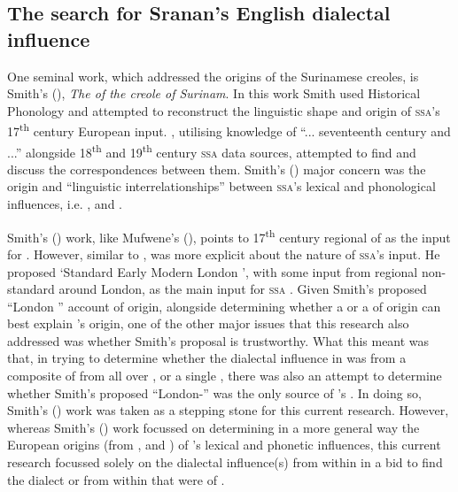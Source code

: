 \subsection{The search for Sranan's English dialectal influence}
One seminal work, which addressed the  origins of the Surinamese  creoles, is Smith's (\citeyear{Smith87}), \textit{The  of the creole  of Surinam}. In this work Smith used Historical Phonology and attempted to reconstruct the linguistic shape and origin of \textsc{ssa}'s 17\textsuperscript{th} century European input.  \citet[6]{Smith87}, utilising knowledge of  ``... seventeenth century  and ...'' alongside 18\textsuperscript{th} and 19\textsuperscript{th} century \textsc{ssa} data sources, attempted to find and discuss the correspondences between them. Smith's (\citeyear{Smith87}) major concern was the origin and ``linguistic interrelationships'' between \textsc{ssa}'s lexical and phonological influences, i.e. ,  and .

Smith's (\citeyear{Smith87}) work, like Mufwene's (\citeyear{Mufwene01}), points to 17\textsuperscript{th} century regional  of  as the input for  . However, similar to \citet{Chaudenson79}, \citet{Smith87} was more explicit about the nature of \textsc{ssa}'s  input. He proposed `Standard Early Modern London ', with some input from regional non-standard  around London, as the main input for \textsc{ssa} \citep{Smith08, Smith87}. Given Smith's proposed ``London '' account of origin, alongside determining whether a  or a  of origin can best explain 's   origin, one of the other major issues that this research also addressed was whether Smith's proposal is trustworthy. What this meant was that, in trying to determine whether the  dialectal influence in  was from a composite of  \citep{Mufwene08, Mufwene01} from all over , or a single , there was also an attempt to determine whether Smith's proposed ``London-'' was the only source of 's  . In doing so, Smith's (\citeyear{Smith87}) work was taken as a stepping stone for this current research. However, whereas Smith's (\citeyear{Smith87}) work focussed on determining in a more general way the European origins (from ,  and ) of 's lexical and phonetic influences, this current research focussed solely on the  dialectal influence(s) from within  in a bid to find the dialect or  from within  that were of .

